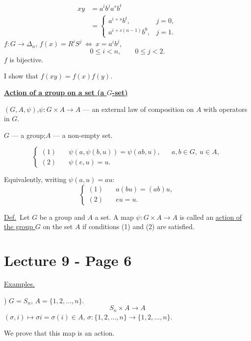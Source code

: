 \[
\begin{aligned}
xy&=a^i b^j a^s b^t\\
  &=\begin{cases}
      a^{i+s}b^t, & j=0,\\[2pt]
      a^{i+s(n-1)}b^0, & j=1.
    \end{cases}
\end{aligned}
\]
\bigskip
\noindent $f:G\longrightarrow\Delta_n$,\quad
$f(x)=R^iS^j\ \Longleftrightarrow\ x=a^i b^j$,
\[
0\leq i<n,\qquad 0\leq j<2.
\]
\noindent $f$ is bijective.

\noindent I show that $f(xy)=f(x)f(y)$.

\bigskip
\noindent\underline{\textbf{Action of a group on a set (a $G$-set)}}

\bigskip
\noindent $(G,A,\psi)$,\quad $\psi:G\times A\longrightarrow A$ --- an external
law of composition on $A$ with operators in $G$.

\noindent $G$ --- a group;\quad $A$ --- a non-empty set.

\[
\left\{\begin{aligned}
(1)\quad &\psi(a,\psi(b,u))=\psi(ab,u), && a,b\in G,\ u\in A,\\
(2)\quad &\psi(e,u)=u.
\end{aligned}\right.
\]

\noindent Equivalently, writing $\psi(a,u)=au$:
\[
\left\{\begin{aligned}
(1)\quad &a(bu)=(ab)u,\\
(2)\quad &eu=u.
\end{aligned}\right.
\]

\bigskip
\noindent\underline{Def.}\ Let $G$ be a group and $A$ a set. A map
$\psi:G\times A\longrightarrow A$ is called an \underline{action of the group $G$} on the set $A$
if conditions (1) and (2) are satisfied.






\section*{Lecture 9 - Page 6}

\noindent\underline{Examples.}

) $G=S_n$, \qquad $A=\{1,2,\ldots,n\}$.
\[
S_n\times A\longrightarrow A
\]
\noindent $(\sigma,i)\longmapsto \sigma i=\sigma(i)\in A$, \qquad
$\sigma:\{1,2,\ldots,n\}\longrightarrow\{1,2,\ldots,n\}$.

\bigskip
\noindent We prove that this map is an action.

